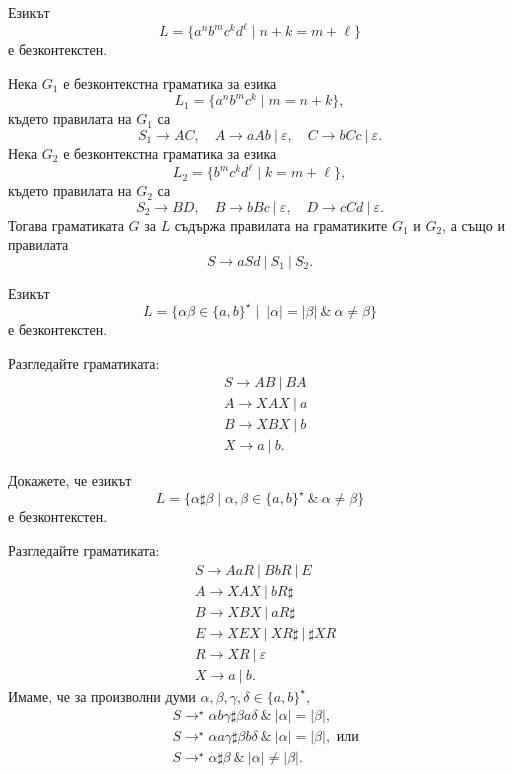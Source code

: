 \begin{example}
  Езикът 
  \[L = \{a^nb^mc^kd^\ell \mid n+k = m + \ell\}\]
  е безконтекстен.
\end{example}
\begin{hint}
  Нека $G_1$ е безконтекстна граматика за езика
  \[L_1 = \{a^nb^mc^k \mid m = n+k\},\]
  където правилата на $G_1$ са
  \[S_1 \to AC,\quad  A \to aAb\ |\ \varepsilon,\quad C \to bCc\ |\ \varepsilon.\]
  Нека $G_2$ е безконтекстна граматика за езика 
  \[L_2 = \{b^mc^kd^\ell \mid k = m+\ell\},\]
  където правилата на $G_2$ са
  \[S_2 \to BD,\quad B \to bBc\ |\ \varepsilon,\quad D \to cCd\ |\ \varepsilon.\]
  Тогава граматиката $G$ за $L$ 
  съдържа правилата на граматиките $G_1$ и $G_2$, а също и правилата
  \[S \to aSd\ |\ S_1\ |\ S_2.\]
\end{hint}

\begin{problem}
  \label{prob:equal-but-different}
  Езикът
  \[L = \{\alpha\beta \in \{a,b\}^\star \mid\ |\alpha| = |\beta|\ \&\ \alpha \neq \beta\}\]
  е безконтекстен.
\end{problem}
\begin{hint}
  Разгледайте граматиката:
  \begin{align*}
    & S \to AB\ |\ BA\\
    & A \to XAX\ |\ a\\
    & B \to XBX\ |\ b\\
    & X \to a\ |\ b.
  \end{align*}
\end{hint}

\begin{problem}
 Докажете, че езикът
 \[L = \{\alpha \sharp \beta \mid \alpha,\beta \in \{a,b\}^\star\ \&\ \alpha \neq \beta \}\]
 е безконтекстен.
\end{problem}
\begin{hint}
  Разгледайте граматиката:
  \begin{align*}
    & S \to AaR\ |\ BbR\ |\ E\\
    & A \to XAX\ |\ bR\sharp\\
    & B \to XBX\ |\ aR\sharp\\
    & E \to XEX\ |\ XR\sharp\ |\ \sharp XR\\
    & R \to XR\ |\ \varepsilon\\
    & X \to a\ |\ b.
  \end{align*}
  Имаме, че за произволни думи $\alpha,\beta,\gamma,\delta \in \{a,b\}^\star$,
  \begin{align*}
    & S \to^\star \alpha b \gamma \sharp \beta a \delta\ \&\ |\alpha| = |\beta|,\\
    & S \to^\star \alpha a \gamma \sharp \beta b \delta\ \&\ |\alpha| = |\beta|, \text{ или}\\
    & S \to^\star \alpha \sharp \beta\ \&\ |\alpha| \neq |\beta|.
  \end{align*}      
\end{hint}






